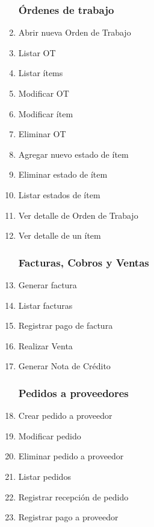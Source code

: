 \documentclass[12pt]{extarticle}
\begin{document}
\begin{spacing}{1.2}
\begin{multicols}{2}
\begin{enumerate}
            \subsubsection*{Órdenes de trabajo}
                \item Abrir nueva Orden de Trabajo
                \item Listar OT
                \item Listar ítems
                \item Modificar OT 
                \item Modificar ítem
                \item Eliminar OT
                \item Agregar nuevo estado de ítem
                \item Eliminar estado de ítem
                \item Listar estados de ítem
                \item Ver detalle de Orden de Trabajo
                \item Ver detalle de un ítem
            \subsubsection*{Facturas, Cobros y Ventas}
                \item Generar factura 
                \item Listar facturas
                \item Registrar pago de factura
                \item Realizar Venta
                \item Generar Nota de Crédito
            \subsubsection*{Pedidos a proveedores}
                \item Crear pedido a proveedor
                \item Modificar pedido %
                \item Eliminar pedido a proveedor
                \item Listar pedidos
                \item Registrar recepción de pedido
                \item Registrar pago a proveedor
        \end{enumerate}
        \end{multicols}


\end{spacing}
\end{document}
